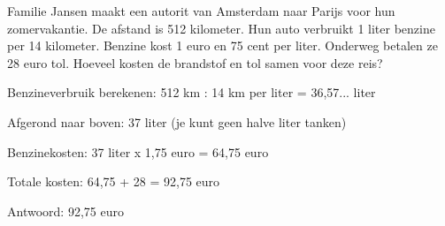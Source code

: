 \begin{opgave}
Familie Jansen maakt een autorit van Amsterdam naar Parijs voor hun 
zomervakantie. De afstand is 512 kilometer. Hun auto verbruikt 1 liter benzine 
per 14 kilometer. Benzine kost 1 euro en 75 cent per liter. Onderweg betalen 
ze 28 euro tol. Hoeveel kosten de brandstof en tol samen voor deze reis?
\end{opgave}

\begin{oplossing}
Benzineverbruik berekenen:
512 km : 14 km per liter = 36,57... liter

Afgerond naar boven: 37 liter (je kunt geen halve liter tanken)

Benzinekosten:
37 liter x 1,75 euro = 64,75 euro

Totale kosten:
64,75 + 28 = 92,75 euro

Antwoord: 92,75 euro
\end{oplossing}